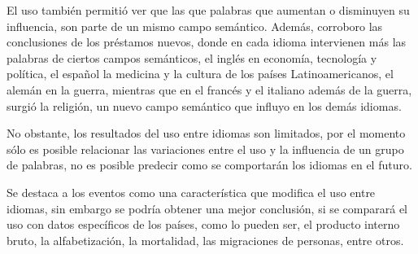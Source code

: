 El uso también permitió ver que las que palabras que aumentan o disminuyen su influencia, son parte de un mismo campo semántico. Además, corroboro las conclusiones de los préstamos nuevos, donde en cada idioma intervienen más las palabras de ciertos campos semánticos, el inglés en economía, tecnología y política,  el español la medicina y la cultura de los países Latinoamericanos, el alemán en la guerra,  mientras que en el francés y el italiano además de la guerra, surgió la religión, un nuevo campo semántico que influyo en los demás idiomas. 

No obstante, los resultados del uso entre idiomas son limitados, por el momento sólo es posible relacionar las variaciones entre el uso y la influencia de un grupo de palabras, no es posible predecir como se comportarán los idiomas en el futuro. 


Se destaca a los eventos como una característica que modifica el uso entre idiomas, sin embargo se podría obtener una mejor conclusión, si se comparará el uso con datos específicos de los países, como lo pueden ser, el producto interno bruto, la alfabetización, la mortalidad, las migraciones de personas, entre otros.

 



 





